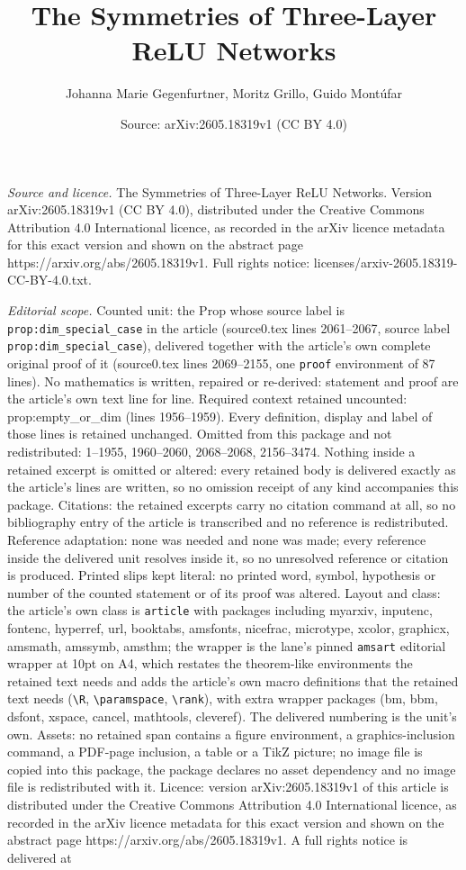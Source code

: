 \documentclass[10pt,a4paper]{amsart}
\title[The Symmetries of Three-Layer ReLU Networks]{The Symmetries of Three-Layer ReLU Networks}
\author{Johanna Marie Gegenfurtner, Moritz Grillo, Guido Mont\'ufar}
\date{Source: arXiv:2605.18319v1 (CC BY 4.0)}
\begin{document}
\maketitle

\noindent\emph{Source and licence.} The Symmetries of Three-Layer ReLU Networks. Version arXiv:2605.18319v1 (CC BY 4.0), distributed under the Creative Commons Attribution 4.0 International licence, as recorded in the arXiv licence metadata for this exact version and shown on the abstract page https://arxiv.org/abs/2605.18319v1. Full rights notice: licenses/arxiv-2605.18319-CC-BY-4.0.txt.\par\smallskip

\noindent\textit{Editorial scope.} Counted unit: the Prop whose source label is \texttt{prop:dim\_special\_case} in the article (source0.tex lines 2061--2067, source label \texttt{prop:dim\_special\_case}), delivered together with the article's own complete original proof of it (source0.tex lines 2069--2155, one \texttt{proof} environment of 87 lines). No mathematics is written, repaired or re-derived: statement and proof are the article's own text line for line. Required context retained uncounted: prop:empty\_or\_dim (lines 1956--1959). Every definition, display and label of those lines is retained unchanged. Omitted from this package and not redistributed: 1--1955, 1960--2060, 2068--2068, 2156--3474. Nothing inside a retained excerpt is omitted or altered: every retained body is delivered exactly as the article's lines are written, so no omission receipt of any kind accompanies this package. Citations: the retained excerpts carry no citation command at all, so no bibliography entry of the article is transcribed and no reference is redistributed. Reference adaptation: none was needed and none was made; every reference inside the delivered unit resolves inside it, so no unresolved reference or citation is produced. Printed slips kept literal: no printed word, symbol, hypothesis or number of the counted statement or of its proof was altered. Layout and class: the article's own class is \texttt{article} with packages including myarxiv, inputenc, fontenc, hyperref, url, booktabs, amsfonts, nicefrac, microtype, xcolor, graphicx, amsmath, amssymb, amsthm; the wrapper is the lane's pinned \texttt{amsart} editorial wrapper at 10pt on A4, which restates the theorem-like environments the retained text needs and adds the article's own macro definitions that the retained text needs (\texttt{\textbackslash R}, \texttt{\textbackslash paramspace}, \texttt{\textbackslash rank}), with extra wrapper packages (bm, bbm, dsfont, xspace, cancel, mathtools, cleveref). The delivered numbering is the unit's own. Assets: no retained span contains a figure environment, a graphics-inclusion command, a PDF-page inclusion, a table or a TikZ picture; no image file is copied into this package, the package declares no asset dependency and no image file is redistributed with it. Licence: version arXiv:2605.18319v1 of this article is distributed under the Creative Commons Attribution 4.0 International licence, as recorded in the arXiv licence metadata for this exact version and shown on the abstract page https://arxiv.org/abs/2605.18319v1. A full rights notice is delivered at 
\end{document}
